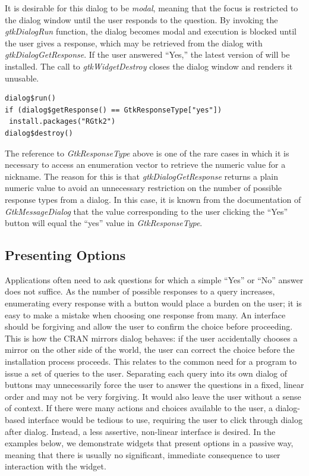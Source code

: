 \documentclass[article]{jss}
\begin{document}
It is desirable for this dialog to be \emph{modal}, meaning that the focus
is restricted to the dialog window until the user responds to the question. By
invoking the \emph{gtkDialogRun} function, the dialog becomes modal and execution
is blocked until the user gives a response, which may be retrieved from the 
dialog with \emph{gtkDialogGetResponse}. If the user answered ``Yes,'' the 
latest version of  will be installed. The call to \emph{gtkWidgetDestroy}
closes the dialog window and renders it unusable.
\begin{verbatim}
dialog$run()
if (dialog$getResponse() == GtkResponseType["yes"])
 install.packages("RGtk2")
dialog$destroy()
\end{verbatim}
The reference to \emph{GtkResponseType} above is one of the rare cases in which
it is necessary to access an enumeration vector to retrieve the numeric value
for a nickname. The reason for this is that \emph{gtkDialogGetResponse} returns
a plain numeric value to avoid an unnecessary restriction on the number of 
possible response types from a dialog. In this case, it is known from
the documentation of \emph{GtkMessageDialog} that the value corresponding to
the user clicking the ``Yes'' button will equal the ``yes'' value in \emph{GtkResponseType}.

\subsection{Presenting Options}

Applications often need to ask questions for which a simple ``Yes'' or ``No''
answer does not suffice. As the number of possible responses to a query increases, 
enumerating every response with a button would place a burden on the user;
it is easy to make a mistake when choosing one response from many. An interface
should be forgiving and allow the user to confirm the choice before proceeding.
This is how the CRAN mirrors dialog behaves: if the user accidentally chooses a 
mirror on the other side of the world, the user can correct the choice before
the installation process proceeds. This relates to the common need for a program 
to issue a set of queries to the user. Separating each query into its own dialog
of buttons may unnecessarily force the user to answer the questions in a 
fixed, linear order and may not be very forgiving. It would also leave
the user without a sense of context. If there were many actions
and choices available to the user, a dialog-based interface would be tedious to 
use, requiring the user to click through dialog after dialog. Instead, a less 
assertive, non-linear interface is desired. In the examples below, we
demonstrate widgets that present options in a passive way, meaning that
there is usually no significant, immediate consequence to user interaction 
with the widget.
\end{document}
